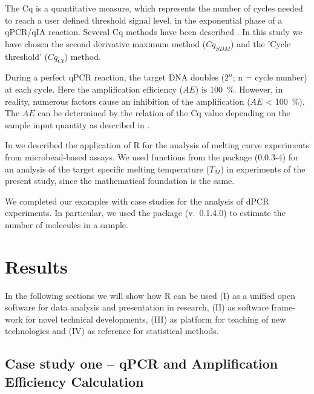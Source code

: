 The Cq is a quantitative measure, which represents the number of cycles 
needed to reach a user defined threshold signal level, in the exponential phase 
of a qPCR/qIA reaction. Several Cq methods have been described 
\citep{ruijter_2013}. In this study we have chosen the second derivative maximum 
method ($Cq_{SDM}$) and the 'Cycle threshold' ($Cq_{Ct}$) method.

During a perfect qPCR reaction, the target DNA doubles ($2^{n}$; n = cycle 
number) at each cycle. Here the amplification efficiency ($AE$) is 100~\%. 
However, in reality, numerous factors cause an inhibition of the amplification 
($AE$ < 100~\%). The $AE$ can be determined by the relation of the Cq value 
depending on the sample input quantity as described in 
\citep{roediger_2015_Bioinformatics, svec_2015}.

In \citet{roediger_RJ_2013} we described the application of R for the analysis 
of melting curve experiments from microbead-based assays. We used functions from 
the  package (0.0.3-4) for an analysis of the target specific 
melting temperature ($T_{M}$) in experiments of the present study, since the 
mathematical foundation is the same.

We completed our examples with case studies for the analysis of dPCR 
experiments. In particular, we used the  package (v.~0.1.4.0) to 
estimate the number of molecules in a sample.

\section{Results}

In the following sections we will show how R can be used (I) as a unified open 
software for data analysis and presentation in research, (II) as software 
frame-work for novel technical developments, (III) as platform for teaching of 
new technologies and (IV) as reference for statistical methods.

\subsection{Case study one -- qPCR and Amplification Efficiency Calculation}

